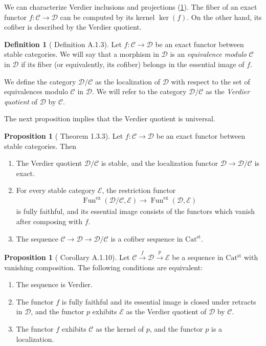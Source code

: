 \documentclass[a4paper,dvipdfmx,11pt,reqno]{amsart}
\DeclareMathOperator{\Fun}{Fun}
\newcommand{\C}{\mathcal{C}}
\newcommand{\D}{\mathcal{D}}
\newcommand{\E}{\mathcal{E}}
\newcommand{\Catst}{\mathrm{Cat^{st}}}
\theoremstyle{definition}
\newtheorem{definition}[theorem]{Definition}
\newtheorem{proposition}[theorem]{Proposition}
\begin{document}
We can characterize Verdier inclusions and projections (\cref{CDH23.cor.A.1.10}).
The fiber of an exact functor $f : \C \to \D$ can be computed by its kernel $\ker(f)$.
On the other hand, its cofiber is described by the Verdier quotient.

\begin{definition}[\cite{CDH23} Definition A.1.3] \label{CDH23.def.A.1.3}
  Let $f : \C \to \D$ be an exact functor between stable categories.
  We will say that a morphism in $\D$ is an \textit{equivalence modulo} $\C$ in $\D$ if its fiber (or equivalently, its cofiber) belongs in the essential image of $f$.

  We define the category $\D/\C$ as the localization of $\D$ with respect to the set of equivalences modulo $\C$ in $\D$.
  We will refer to the category $\D/\C$ as the \textit{Verdier quotient} of $\D$ by $\C$.
\end{definition}

The next proposition implies that the Verdier quotient is universal.

\begin{proposition}[\cite{NS18} Theorem 1.3.3] \label{NS18.thrm.1.3.3}
  Let $f : \C \to \D$ be an exact functor between stable categories.
  Then
  \begin{enumerate}
    \item The Verdier quotient $\D/\C$ is stable, and the localization functor $\D \to \D/\C$ is exact.
    \item For every stable category $\E$, the restriction functor
    \begin{align*}
      \Fun^{\mathrm{ex}}(\D/\C,\E) \to \Fun^{\mathrm{ex}}(\D,\E)
    \end{align*}
    is fully faithful, and its essential image consists of the functors which vanish after composing with $f$.
    \item The sequence $\C \to \D \to \D/\C$ is a cofiber sequence in $\Catst$.
  \end{enumerate} 
\end{proposition}

\begin{proposition}[\cite{CDH23} Corollary A.1.10] \label{CDH23.cor.A.1.10}
  Let $\C \xrightarrow{f} \D \xrightarrow{p} \E$ be a sequence in $\Catst$ with vanishing composition.
  The following conditions are equivalent:
  \begin{enumerate}
    \item The sequence is Verdier.
    \item The functor $f$ is fully faithful and its essential image is closed under retracts in $\D$, and the functor $p$ exhibits $\E$ as the Verdier quotient of $\D$ by $\C$.
    \item The functor $f$ exhibits $\C$ as the kernel of $p$, and the functor $p$ is a localization.
  \end{enumerate}
\end{proposition}
\end{document}
